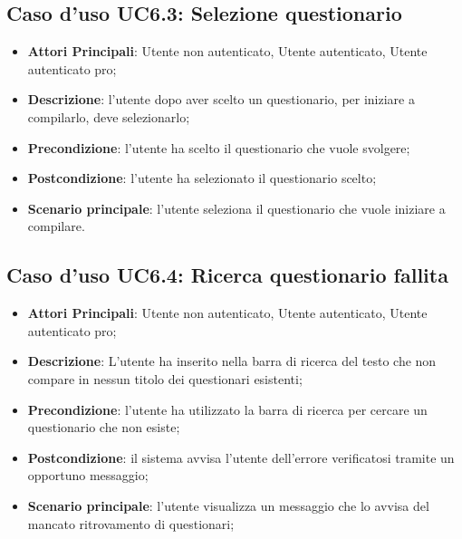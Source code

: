 \subsection{Caso d'uso UC6.3: Selezione questionario}
\begin{itemize}
\item\textbf{Attori Principali}: Utente non autenticato, Utente autenticato, Utente autenticato pro;
\item\textbf{Descrizione}: l'utente dopo aver scelto un questionario, per iniziare a compilarlo, deve selezionarlo;
\item\textbf{Precondizione}: l'utente ha scelto il questionario che vuole svolgere;
\item\textbf{Postcondizione}: l'utente ha selezionato il questionario scelto;
\item\textbf{Scenario principale}: l'utente seleziona il questionario che vuole iniziare a compilare.
\end{itemize}

\subsection{Caso d'uso UC6.4: Ricerca questionario fallita}
\begin{itemize}
\item\textbf{Attori Principali}: Utente non autenticato, Utente autenticato, Utente autenticato pro;
\item\textbf{Descrizione}: L'utente ha inserito nella barra di ricerca del testo che non compare in nessun titolo dei questionari esistenti;
\item\textbf{Precondizione}: l'utente ha utilizzato la barra di ricerca per cercare un questionario che non esiste;
\item\textbf{Postcondizione}: il sistema avvisa l'utente dell'errore verificatosi tramite un opportuno messaggio;
\item\textbf{Scenario principale}: l'utente visualizza un messaggio che lo avvisa del mancato ritrovamento di questionari;
\end{itemize}